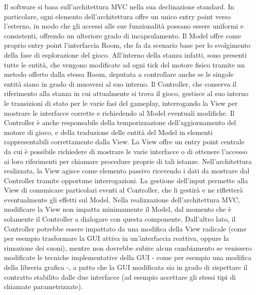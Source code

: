 \documentclass[a4paper,12pt]{report}
\begin{document}
Il software si basa sull’architettura MVC nella sua declinazione standard. In particolare, ogni elemento dell’architettura offre un unico entry point verso l’esterno, in modo che gli accessi alle sue funzionalità possano essere uniformi e consistenti, offrendo un ulteriore grado di incapsulamento.
%
\newline Il Model offre come proprio entry point l’interfaccia Room, che fa da scenario base per lo svolgimento della fase di esplorazione del gioco. All’interno della stanza infatti, sono presenti tutte le entità, che vengono modificate ad ogni tick del motore fisico tramite un metodo offerto dalla stessa Room, deputata a controllare anche se le singole entità siano in grado di muoversi al suo interno. 
%
\newline Il Controller, che conserva il riferimento alla stanza in cui attualmente si trova il gioco, gestisce al suo interno le transizioni di stato per le varie fasi del gameplay, interrogando la View per mostrare le interfacce corrette e richiedendo al Model eventuali modifiche. Il Controller è anche responsabile della temporizzazione dell’aggiornamento del motore di gioco, e della traduzione delle entità del Model in elementi rappresentabili correttamente dalla View.
%
\newline La View offre un entry point centrale da cui è possibile richiedere di mostrare le varie interfacce o di ottenere l’accesso ai loro riferimenti per chiamare procedure proprie di tali istanze. Nell’architettura realizzata, la View agisce come elemento passivo ricevendo i dati da mostrare dal Controller tramite opportune interrogazioni. La gestione dell’input permette alla View di comunicare particolari eventi al Controller, che li gestirà e ne rifletterà eventualmente gli effetti sul Model.
%
\newline Nella realizzazione dell’architettura MVC, modificare la View non impatta minimamente il Model, dal momento che è solamente il Controller a dialogare con questa componente. Dall’altro lato, il Controller potrebbe essere impattato da una modifica della View radicale (come per esempio trasformare la GUI attiva in un’interfaccia reattiva, oppure la rimozione dei suoni), mentre non dovrebbe subire alcun cambiamento se venissero modificate le tecniche implementative della GUI - come per esempio una modifica della libreria grafica -, a patto che la GUI modificata sia in grado di rispettare il contratto stabilito dalle due interfacce (ad esempio accettare gli stessi tipi di chiamate parametrizzate).
\end{document}
